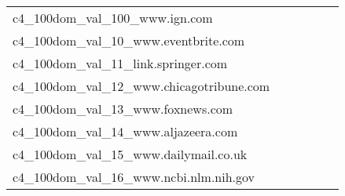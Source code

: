 {\begin{longtable}{m{6cm}m{1.7cm}m{1.7cm}m{1.7cm}m{1.7cm}m{1.7cm}}
	c4\_100dom\_val\_100\_www.ign.com  & \colorbox[HTML]{fdfede}{\makebox[\mywidth][c]{16.22}} & \colorbox[HTML]{eaf7af}{\makebox[\mywidth][c]{15.75}} & \colorbox[HTML]{ffffe5}{\makebox[\mywidth][c]{17.10}} & \colorbox[HTML]{ddf1a6}{\makebox[\mywidth][c]{15.67}} & \colorbox[HTML]{77c578}{\makebox[\mywidth][c]{15.43}}\\
	c4\_100dom\_val\_10\_www.eventbrite.com  & \colorbox[HTML]{fdfedf}{\makebox[\mywidth][c]{12.72}} & \colorbox[HTML]{e6f5ad}{\makebox[\mywidth][c]{12.33}} & \colorbox[HTML]{ffffe5}{\makebox[\mywidth][c]{13.33}} & \colorbox[HTML]{dff2a7}{\makebox[\mywidth][c]{12.30}} & \colorbox[HTML]{77c578}{\makebox[\mywidth][c]{12.12}}\\
	c4\_100dom\_val\_11\_link.springer.com  & \colorbox[HTML]{fbfdd0}{\makebox[\mywidth][c]{8.66}} & \colorbox[HTML]{f2fab5}{\makebox[\mywidth][c]{8.54}} & \colorbox[HTML]{ffffe5}{\makebox[\mywidth][c]{9.31}} & \colorbox[HTML]{c5e799}{\makebox[\mywidth][c]{8.42}} & \colorbox[HTML]{77c578}{\makebox[\mywidth][c]{8.33}}\\
	c4\_100dom\_val\_12\_www.chicagotribune.com  & \colorbox[HTML]{ffffe5}{\makebox[\mywidth][c]{12.09}} & \colorbox[HTML]{eff8b3}{\makebox[\mywidth][c]{11.60}} & \colorbox[HTML]{ffffe5}{\makebox[\mywidth][c]{12.49}} & \colorbox[HTML]{e3f4aa}{\makebox[\mywidth][c]{11.55}} & \colorbox[HTML]{77c578}{\makebox[\mywidth][c]{11.37}}\\
	c4\_100dom\_val\_13\_www.foxnews.com  & \colorbox[HTML]{ffffe5}{\makebox[\mywidth][c]{9.59}} & \colorbox[HTML]{e7f5ad}{\makebox[\mywidth][c]{9.21}} & \colorbox[HTML]{ffffe5}{\makebox[\mywidth][c]{9.83}} & \colorbox[HTML]{d0ec9e}{\makebox[\mywidth][c]{9.16}} & \colorbox[HTML]{77c578}{\makebox[\mywidth][c]{9.08}}\\
	c4\_100dom\_val\_14\_www.aljazeera.com  & \colorbox[HTML]{ffffe5}{\makebox[\mywidth][c]{10.97}} & \colorbox[HTML]{f5fbb8}{\makebox[\mywidth][c]{10.61}} & \colorbox[HTML]{ffffe5}{\makebox[\mywidth][c]{11.31}} & \colorbox[HTML]{ceeb9e}{\makebox[\mywidth][c]{10.50}} & \colorbox[HTML]{77c578}{\makebox[\mywidth][c]{10.40}}\\
	c4\_100dom\_val\_15\_www.dailymail.co.uk  & \colorbox[HTML]{fefee3}{\makebox[\mywidth][c]{12.42}} & \colorbox[HTML]{f6fbb8}{\makebox[\mywidth][c]{11.97}} & \colorbox[HTML]{ffffe5}{\makebox[\mywidth][c]{12.87}} & \colorbox[HTML]{daf0a4}{\makebox[\mywidth][c]{11.85}} & \colorbox[HTML]{77c578}{\makebox[\mywidth][c]{11.69}}\\
	c4\_100dom\_val\_16\_www.ncbi.nlm.nih.gov  & \colorbox[HTML]{fbfdd3}{\makebox[\mywidth][c]{7.39}} & \colorbox[HTML]{f8fcc1}{\makebox[\mywidth][c]{7.31}} & \colorbox[HTML]{ffffe5}{\makebox[\mywidth][c]{7.98}} & \colorbox[HTML]{aadc8d}{\makebox[\mywidth][c]{7.11}} & \colorbox[HTML]{77c578}{\makebox[\mywidth][c]{7.07}}\\

\end{longtable}}
